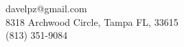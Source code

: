\documentclass[margin,line]{resume}
\begin{document}
{
    \hfill davelpz@gmail.com           \vspace{0mm}\\\vspace{0mm}%
    \hfill 8318 Archwood Circle, Tampa FL, 33615\\\vspace{0mm}%
    \hfill (813) 351-9084 \vspace{0mm}\\\vspace{-9mm}%
}

\end{document}
